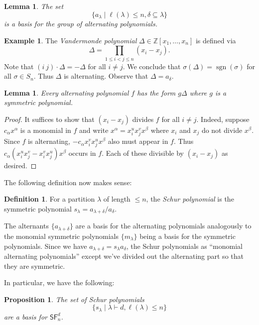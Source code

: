 \documentclass[12pt]{article}
\theoremstyle{plain}
\newtheorem{lemma}[theorem]{Lemma}
\newtheorem{proposition}[theorem]{Proposition}
\theoremstyle{definition}
\newtheorem{definition}[theorem]{Definition}
\newtheorem{example}[theorem]{Example}
\theoremstyle{remark}
\numberwithin{equation}{section}
\begin{document}
\begin{lemma}
The set
\[
\{ a_\lambda \mid \ell(\lambda) \le n, \delta \subseteq \lambda \}
\]
is a basis for the group of alternating polynomials.
\end{lemma}

\begin{example}
The \emph{Vandermonde polynomial} $\Delta \in \mathbb{Z}[x_1,\ldots,x_n]$
is defined via
\[
\Delta = \prod_{1 \le i < j \le n} (x_i-x_j).
\]
Note that $(i\ j) \cdot \Delta = -\Delta$ for all $i \ne j$.
We conclude that $\sigma(\Delta) = \operatorname{sgn}(\sigma)$
for all $\sigma \in S_n$.
Thus $\Delta$ is alternating.
Observe that $\Delta=a_\delta$.
\end{example}

\begin{lemma}
Every alternating polynomial $f$ has the form $g \Delta$
where $g$ is a symmetric polynomial. 
\end{lemma}

\begin{proof}
It suffices to show that $(x_i-x_j)$ divides $f$ for all $i \ne j$.
Indeed, suppose $c_\alpha x^\alpha$ is a monomial in $f$
and write $x^\alpha = x_i^u x_j^v x^\beta$ where $x_i$ and $x_j$
do not divide $x^\beta$.
Since $f$ is alternating, $-c_\alpha x_i^v x_j^u x^\beta$
also must appear in $f$.
Thus $c_\alpha (x_i^u x_j^v - x_i^v x_j^u) x^\beta$ occurs in $f$.
Each of these divisible by $(x_i-x_j)$ as desired.
\end{proof}

The following definition now makes sense:

\begin{definition}
For a partition $\lambda$ of length $\le n$, the \emph{Schur polynomial}
is the symmetric polynomial
$s_\lambda = a_{\lambda+\delta}/a_\delta$.
\end{definition}

The alternants $\{ a_{\lambda+\delta} \}$ are a basis for
the alternating polynomials analogously to the monomial symmetric
polynomials $\{ m_\lambda \}$ being a basis for the symmetric
polynomials.
Since we have $a_{\lambda+\delta}=s_\lambda a_\delta$, the Schur polynomials
as ``monomial alternating polynomials'' except we've divided out the
alternating part so that they are symmetric.

In particular, we have the following:

\begin{proposition}
The set of Schur polynomials
\[
\{ s_\lambda \mid \lambda \vdash d, \ell(\lambda) \le n \}
\]
are a basis for $\mathsf{SF}^d_n$.
\end{proposition}
\end{document}
